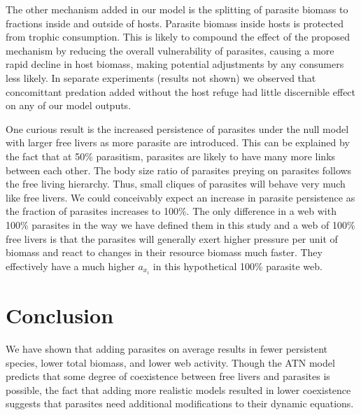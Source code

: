 \documentclass[/home/nkappler/Research/Dissertation/dissertation.tex]{subfiles}
\begin{document}
\begin{bibunit}
The other mechanism added in our model is the splitting of parasite biomass to
fractions inside and outside of hosts. Parasite biomass inside hosts is
protected from trophic consumption. This is likely to compound the effect of
the proposed mechanism by reducing the overall vulnerability of parasites,
causing a more rapid decline in host biomass, making potential adjustments by
any consumers less likely. In separate experiments (results not shown) we
observed that concomittant predation added without the host refuge had little
discernible effect on any of our model outputs.

One curious result is the increased persistence of parasites under the null
model with larger free livers as more parasite are introduced. This can be
explained by the fact that at 50\% parasitism, parasites are likely to have
many more links between each other. The body size ratio of parasites preying on
parasites follows the free living hierarchy. Thus, small cliques of parasites
will behave very much like free livers. We could conceivably expect an increase
in parasite persistence as the fraction of parasites increases to 100\%. The
only difference in a web with 100\% parasites in the way we have defined them
in this study and a web of 100\% free livers is that the parasites will
generally exert higher pressure per unit of biomass and react to changes in
their resource biomass much faster. They effectively have a much higher
$a_{x_i}$ in this hypothetical 100\% parasite web.

\section{Conclusion}

We have shown that adding parasites on average results in fewer persistent
species, lower total biomass, and lower web activity. Though the ATN model
predicts that some degree of coexistence between free livers and parasites is
possible, the fact that adding more realistic models resulted in lower
coexistence suggests that parasites need additional modifications to their
dynamic equations.

\clearpage
{}
\putbib

\end{bibunit}
\end{document}
